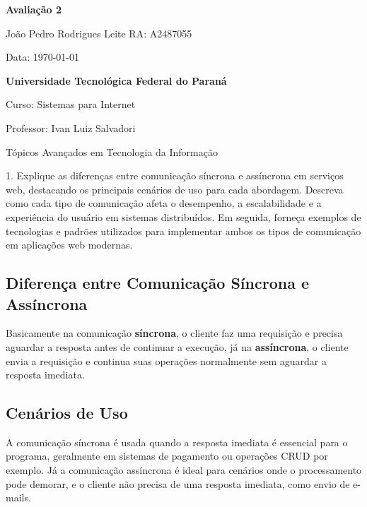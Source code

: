 \documentclass{article}
\begin{document}
	
	\begin{titlepage}
		\centering
		\vspace*{2cm}
		
		\Huge
		\textbf{Avaliação 2}
		
		\vspace{1.5cm}
		
		\LARGE
		João Pedro Rodrigues Leite
		RA: A2487055
		
		\vspace{0.5cm}
		\LARGE
		Data: \today
		
		\vspace{1.5cm}
		
		\textbf{Universidade Tecnológica Federal do Paraná}
		
		\vfill
		
		\Large
		Curso: Sistemas para Internet
		
		\vspace{0.5cm}
		\Large
		Professor: Ivan Luiz Salvadori
		
		\vspace{0.5cm}
		\Large
		Tópicos Avançados em Tecnologia da Informação
	\end{titlepage}
		
	\noindent\large{1. Explique as diferenças entre comunicação síncrona e assíncrona em serviços web, destacando os principais cenários de uso para cada abordagem. Descreva como cada tipo de comunicação afeta o desempenho, a escalabilidade e a experiência do usuário em sistemas distribuídos. Em seguida, forneça exemplos de tecnologias e padrões utilizados para implementar ambos os tipos de comunicação em aplicações web modernas.}

	\subsection*{Diferença entre Comunicação Síncrona e Assíncrona}
	
	Basicamente na comunicação \textbf{síncrona}, o cliente faz uma requisição e precisa aguardar a resposta antes de continuar a execução, já na \textbf{assíncrona}, o cliente envia a requisição e continua suas operações normalmente sem aguardar a resposta imediata.
	
	\subsection*{Cenários de Uso}
	A comunicação síncrona é usada quando a resposta imediata é essencial para o programa, geralmente em sistemas de pagamento ou operações CRUD por exemplo. Já a comunicação assíncrona é ideal para cenários onde o processamento pode demorar, e o cliente não precisa de uma resposta imediata, como envio de e-mails.
	
\end{document}
